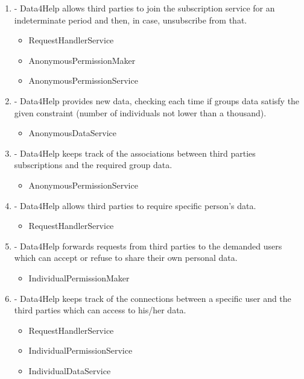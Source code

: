\documentclass[a4paper]{article}
\begin{document}
\begin{enumerate}[label*=\bf{R.\arabic*}]
\item - Data4Help allows third parties to join the subscription service for an
indeterminate period and then, in case, unsubscribe from that.

\begin{itemize}
\item RequestHandlerService
\item AnonymousPermissionMaker
\item AnonymousPermissionService
\end{itemize}

\item - Data4Help provides new data, checking each time if groups data satisfy the given constraint (number of individuals not lower than a
thousand).

\begin{itemize}
\item AnonymousDataService
\end{itemize}

\item - Data4Help keeps track of the associations between third parties subscriptions and the required group data.

\begin{itemize}
\item AnonymousPermissionService
\end{itemize}

\item - Data4Help allows third parties to require specific person’s data.

\begin{itemize}
\item RequestHandlerService
\end{itemize}

\item - Data4Help forwards requests from third parties to the demanded users which can accept or refuse to share their own personal data.

\begin{itemize}
\item IndividualPermissionMaker
\end{itemize}

\item - Data4Help keeps track of the connections between a specific user and the third parties which can access to his/her data.

\begin{itemize}
\item RequestHandlerService
\item IndividualPermissionService
\item IndividualDataService
\end{itemize}


\end{enumerate}
\end{document}
